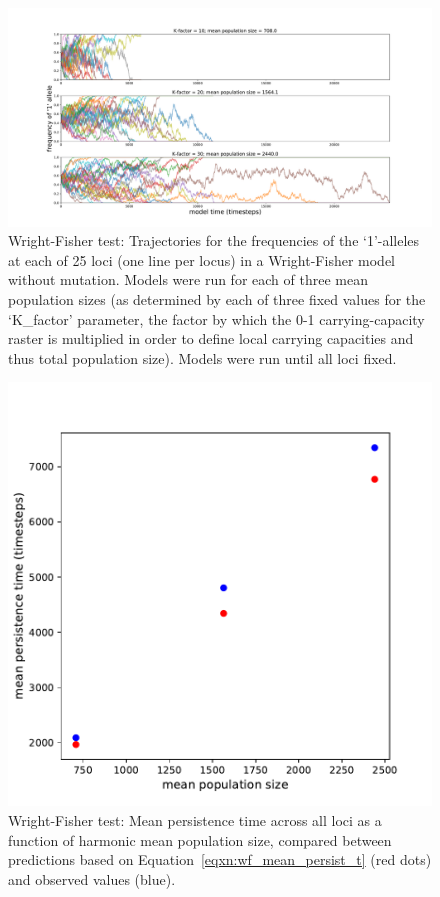 ﻿\documentclass{article}
\begin{document}
\begin{figure}[ht]
\includegraphics[width=175mm]{./img/final/WF_allele_trajectories.pdf}
        \caption{Wright-Fisher test: Trajectories for the frequencies of
                 the `1'-alleles at each of 25 loci (one line per locus)
                 in a Wright-Fisher model without mutation.
                 Models were run for each of three mean population sizes
                 (as determined by each of three fixed values for the
                 `K\_factor' parameter, the factor by which the 0-1
                 carrying-capacity raster is multiplied in order to
                 define local carrying capacities and thus total population
                 size).
                 Models were run until all loci fixed.}
        \label{fig:wf_trajs}
\end{figure}


\begin{figure}[!p]
\includegraphics[width=150mm]{./img/final/WF_mean_persist_vs_pop_size.pdf}
        \caption{Wright-Fisher test: Mean persistence time across all loci
                 as a function of harmonic mean population size,
                 compared between predictions based on
                 Equation~\ref{eqxn:wf_mean_persist_t} (red dots)
                 and observed values (blue).}
        \label{fig:wf_persist_vs_popsize}
\end{figure}
\end{document}
